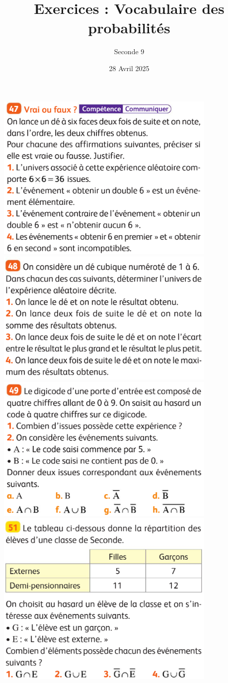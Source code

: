 \documentclass{article}
\title{Exercices : Vocabulaire des probabilités}
\date{28 Avril 2025}
\author{Seconde 9}
\begin{document}
\maketitle
\begin{center}
\includegraphics[width=0.8\textwidth]{Exo_1.png}
\includegraphics[width=0.8\textwidth]{Exo_2.png}
\includegraphics[width=0.8\textwidth]{Exo_3.png}
\includegraphics[width=0.8\textwidth]{Exo_4.png}
\end{center}
\end{document}
